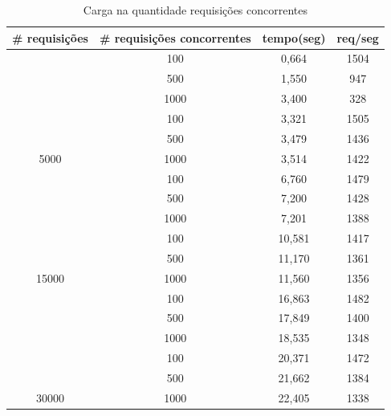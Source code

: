 \begin{table}[ht]
\centering
\begin{tabular}{|c|c|c|c|}
\hline
\# requisições & \# requisições concorrentes & tempo(seg) & req/seg \\ 
\hline
\rowcolor[HTML]{EFEFEF} 
\cellcolor[HTML]{EFEFEF}    & 100      & 0,664      & 1504  \\ \cline{2-4} 
\rowcolor[HTML]{EFEFEF} 
\cellcolor[HTML]{EFEFEF}    & 500      & 1,550      & 947   \\ \cline{2-4} 
\rowcolor[HTML]{EFEFEF} 
\multirow{-3}{*}{\cellcolor[HTML]{EFEFEF}1000}  & 1000     & 3,400      & 328   \\ \hline
        & 100      & 3,321      & 1505  \\ \cline{2-4} 
        & 500      & 3,479      & 1436  \\ \cline{2-4} 
\multirow{-3}{*}{5000}      & 1000     & 3,514      & 1422  \\ \hline
\rowcolor[HTML]{EFEFEF} 
\cellcolor[HTML]{EFEFEF}    & 100      & 6,760      & 1479  \\ \cline{2-4} 
\rowcolor[HTML]{EFEFEF}
\cellcolor[HTML]{EFEFEF}    & 500      & 7,200      & 1428  \\ \cline{2-4} 
\rowcolor[HTML]{EFEFEF} 
\multirow{-3}{*}{\cellcolor[HTML]{EFEFEF}10000} & 1000 & 7,201 & 1388  \\ \hline
        & 100      & 10,581     & 1417  \\ \cline{2-4} 
        & 500      & 11,170     & 1361  \\ \cline{2-4} 
\multirow{-3}{*}{15000}     & 1000     & 11,560     & 1356  \\ \hline
\rowcolor[HTML]{EFEFEF} 
\cellcolor[HTML]{EFEFEF}    & 100      & 16,863     & 1482  \\ \cline{2-4} 
\rowcolor[HTML]{EFEFEF}
\cellcolor[HTML]{EFEFEF}    & 500      & 17,849     & 1400  \\ \cline{2-4} 
\rowcolor[HTML]{EFEFEF}
\multirow{-3}{*}{\cellcolor[HTML]{EFEFEF}25000} & 1000 & 18,535 & 1348  \\ \hline
        & 100      & 20,371     & 1472  \\ \cline{2-4} 
        & 500      & 21,662     & 1384  \\ \cline{2-4} 
\multirow{-3}{*}{30000}     & 1000     & 22,405     & 1338  \\ \hline
\end{tabular}
\caption{Carga na quantidade requisições concorrentes}
\end{table}

